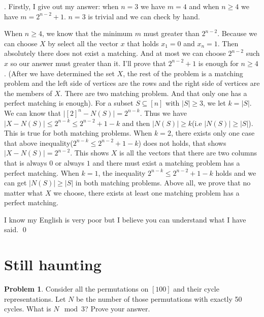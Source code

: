 \documentclass[12pt]{article}
\providecommand{\abs}[1]{\lvert#1\rvert}
\theoremstyle{definition}
\newtheorem{hw}{Problem}
\newenvironment{sol}
  {\par\vspace{3mm}\noindent{\it Solution}.}
  {\qed}
\begin{document}
\begin{sol}
	Firstly, I give out my answer: when $n = 3$ we have $m = 4$ and when $n \geq 4$ we have $m = 2^{n - 2} + 1$. $n = 3$ is trivial and we can check by hand. 
	
	When $n \geq 4$, we know that the minimum $m$ must greater than $2^{n-2}$. Because we can choose $X$ by select all the vector $x$ that holds $x_1 = 0$ and $x_n = 1$. Then absolutely there does not exist a matching. And at most we can choose $2^{n-2}$ such $x$ so our answer must greater than it. I'll prove that $2^{n-2}+1$ is enough for $n \geq 4$. (After we have determined the set $X$, the rest of the problem is a matching problem and the left side of vertices are the rows and the right side of vertices are the members of $X$. There are two matching problem. And that only one has a perfect matching is enough). For a subset $S \subseteq [n]$ with $\abs{S} \geq 3$, we let $k = \abs{S}$. We can know that $\abs{[2]^n-N(S)} = 2^{n-k}$. Thus we have $\abs{X-N(S)} \leq 2^{n-k} \leq 2^{n-2}+1-k$ and then $\abs{N(S)} \geq k$(i.e $\abs{N(S)} \geq \abs{S}$). This is true for both matching problems. When $k = 2$, there exists only one case that above inequality($2^{n-k} \leq 2^{n-2}+1-k$) does not holds, that shows $\abs{X-N(S)} = 2^{n-2}$. This shows $X$ is all the vectors that there are two columns that is always $0$ or always $1$ and there must exist a matching problem has a perfect matching. When $k = 1$, the inequality $2^{n-k} \leq 2^{n-2}+1-k$ holds and we can get $\abs{N(S)} \geq \abs{S}$ in both matching problems. Above all, we prove that no matter what $X$ we choose, there exists at least one matching problem has a perfect matching.
	
	I know my English is very poor but I believe you can understand what I have said.
\end{sol}

\section{Still haunting}

\begin{hw}
Consider all the permutations on $[100]$ and their cycle
representations.
Let $N$ be the number of those permutations with
exactly 50 cycles. What is $N \mod 3$? Prove your answer.
\end{hw}
\end{document}
